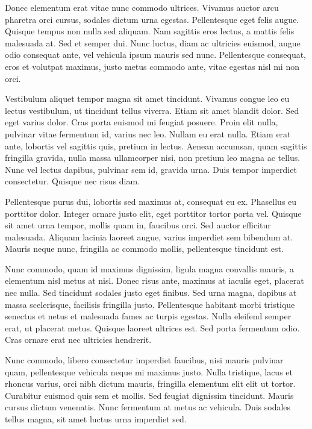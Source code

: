 \documentclass[target=bach,aauheader=,style=]{thud}
\begin{document}
Donec elementum erat vitae nunc commodo ultrices. Vivamus auctor arcu pharetra orci cursus, sodales dictum urna egestas. Pellentesque eget felis augue. Quisque tempus non nulla sed aliquam. Nam sagittis eros lectus, a mattis felis malesuada at. Sed et semper dui. Nunc luctus, diam ac ultricies euismod, augue odio consequat ante, vel vehicula ipsum mauris sed nunc. Pellentesque consequat, eros et volutpat maximus, justo metus commodo ante, vitae egestas nisl mi non orci.

Vestibulum aliquet tempor magna sit amet tincidunt. Vivamus congue leo eu lectus vestibulum, ut tincidunt tellus viverra. Etiam sit amet blandit dolor. Sed eget varius dolor. Cras porta euismod mi feugiat posuere. Proin elit nulla, pulvinar vitae fermentum id, varius nec leo. Nullam eu erat nulla. Etiam erat ante, lobortis vel sagittis quis, pretium in lectus. Aenean accumsan, quam sagittis fringilla gravida, nulla massa ullamcorper nisi, non pretium leo magna ac tellus. Nunc vel lectus dapibus, pulvinar sem id, gravida urna. Duis tempor imperdiet consectetur. Quisque nec risus diam.

Pellentesque purus dui, lobortis sed maximus at, consequat eu ex. Phasellus eu porttitor dolor. Integer ornare justo elit, eget porttitor tortor porta vel. Quisque sit amet urna tempor, mollis quam in, faucibus orci. Sed auctor efficitur malesuada. Aliquam lacinia laoreet augue, varius imperdiet sem bibendum at. Mauris neque nunc, fringilla ac commodo mollis, pellentesque tincidunt est.

Nunc commodo, quam id maximus dignissim, ligula magna convallis mauris, a elementum nisl metus at nisl. Donec risus ante, maximus at iaculis eget, placerat nec nulla. Sed tincidunt sodales justo eget finibus. Sed urna magna, dapibus at massa scelerisque, facilisis fringilla justo. Pellentesque habitant morbi tristique senectus et netus et malesuada fames ac turpis egestas. Nulla eleifend semper erat, ut placerat metus. Quisque laoreet ultrices est. Sed porta fermentum odio. Cras ornare erat nec ultricies hendrerit.

Nunc commodo, libero consectetur imperdiet faucibus, nisi mauris pulvinar quam, pellentesque vehicula neque mi maximus justo. Nulla tristique, lacus et rhoncus varius, orci nibh dictum mauris, fringilla elementum elit elit ut tortor. Curabitur euismod quis sem et mollis. Sed feugiat dignissim tincidunt. Mauris cursus dictum venenatis. Nunc fermentum at metus ac vehicula. Duis sodales tellus magna, sit amet luctus urna imperdiet sed.
\end{document}
